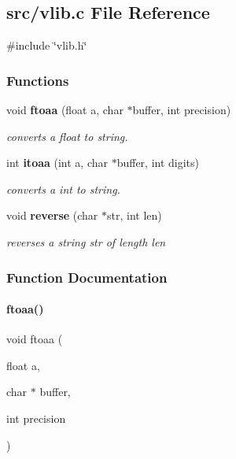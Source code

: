 \subsection{src/vlib.c File Reference}
\label{a00149}
{\ttfamily \#include \char`\"{}vlib.\+h\char`\"{}}\newline
\subsubsection*{Functions}
\begin{DoxyCompactItemize}
\item 
void \textbf{ ftoaa} (float a, char $\ast$buffer, int precision)
\begin{DoxyCompactList}\small\item\em converts a float to string. \end{DoxyCompactList}\item 
int \textbf{ itoaa} (int a, char $\ast$buffer, int digits)
\begin{DoxyCompactList}\small\item\em converts a int to string. \end{DoxyCompactList}\item 
void \textbf{ reverse} (char $\ast$str, int len)
\begin{DoxyCompactList}\small\item\em reverses a string \textquotesingle{}str\textquotesingle{} of length \textquotesingle{}len\textquotesingle{} \end{DoxyCompactList}\end{DoxyCompactItemize}


\subsubsection{Function Documentation}
\mbox{\label{a00149_a4d26b0ac2f26341d827e0a13a0bd49b6}} 
\paragraph{ftoaa()}
{\footnotesize\ttfamily void ftoaa (\begin{DoxyParamCaption}\item[{float}]{a,  }\item[{char $\ast$}]{buffer,  }\item[{int}]{precision }\end{DoxyParamCaption})}



